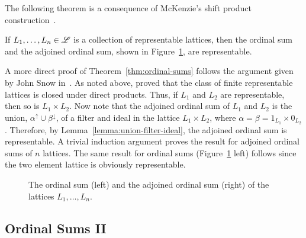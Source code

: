 The following theorem is a consequence of 
McKenzie's shift product construction~\cite{McKenzie:1984}. %
\begin{theorem}
  \label{thm:ordinal-sums}
  If $L_1, \dots, L_n \in \mathscr{L}$ is a collection of representable lattices, then
  the ordinal sum and the adjoined ordinal sum, shown in
  Figure~\ref{fig:ord_adjord}, are representable.
\end{theorem}
A more direct proof of Theorem~\ref{thm:ordinal-sums} follows the argument given
by John Snow in~\cite{Snow:2000}.  As noted above, 
\Jiri \Tuma proved that
the class of finite representable lattices is closed under direct products.
Thus, if $L_1$ and 
$L_2$ are representable, then so is $L_1 \times L_2$.  Now note that the
adjoined ordinal sum of $L_1$ and $L_2$ is the union, $\alpha^\uparrow \cup
\beta^\downarrow$,  of a filter and ideal  
in the lattice $L_1 \times L_2$, where
$\alpha = \beta = 1_{L_1} \times 0_{L_2}$.  
Therefore, by Lemma~\ref{lemma:union-filter-ideal},
the adjoined ordinal sum is representable.  A trivial induction argument proves the
result for adjoined ordinal sums of $n$ lattices.  The same result for ordinal
sums (Figure~\ref{fig:ord_adjord} left) follows since the two element lattice is
obviously representable. 

\begin{center}
  \begin{figure}[h!]
    \label{fig:ord_adjord}
    \centering
        {
          \hskip1cm
        }
        \caption{The ordinal sum (left) and the adjoined ordinal sum (right) of
          the lattices $L_1, \dots, L_n$.}
  \end{figure}
\end{center}

\subsection{Ordinal Sums II}
\newcommand{\m}{\mathbf}

